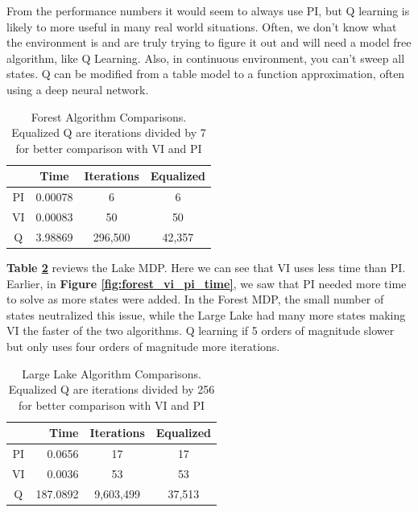 \documentclass[letterpaper]{article} %
\begin{document}
From the performance numbers it would seem to always use PI, but Q learning is likely to more useful in many real world situations.  Often, we don't know what the environment is and are truly trying to figure it out and will need a model free algorithm, like Q Learning.  Also, in continuous environment, you can't sweep all states. Q can be modified from a table model to a function approximation, often using a deep neural network.

\begin{table}[!htb]
	\begin{center}
		\begin{tabular}{| c | c  | c | c |}
			\hline
		 	& Time & Iterations & Equalized\\ 
			\hline
			\hline
			PI & \cellcolor{SpringGreen}0.00078  &  \cellcolor{SpringGreen}6  &\cellcolor{SpringGreen} 6 \\
 			VI & 0.00083 & 50 & 50 \\  
			Q & 3.98869  & 296,500  & 42,357  \\
			\hline
		\end{tabular}
	\end{center}
	\caption{Forest Algorithm Comparisons.  Equalized Q are iterations divided by 7 for better comparison with VI and PI}
	\label{table:forest_comparisons}
\end{table}

\textbf{Table \ref{table:lake_comparisons}} reviews the Lake MDP.  Here we can see that VI uses less time than PI.  Earlier, in \textbf{Figure \ref{fig:forest_vi_pi_time}}, we saw that PI needed more time to solve as more states were added.  In the Forest MDP, the small number of states neutralized this issue, while the Large Lake had many more states making VI the faster of the two algorithms.  Q learning if 5 orders of magnitude slower but only uses four orders of magnitude more iterations. 

\begin{table}[!htb]
	\begin{center}
		\begin{tabular}{| c | r  | c | c |}
			\hline
		 	& Time & Iterations & Equalized\\ 
			\hline
			\hline
			PI & 0.0656 &   \cellcolor{SpringGreen}17  &  \cellcolor{SpringGreen}17 \\
 			VI &  \cellcolor{SpringGreen}0.0036 & 53 & 53\\  
			Q & 187.0892  & 9,603,499  & 37,513  \\
			\hline
		\end{tabular}
	\end{center}
	\caption{Large Lake Algorithm Comparisons.  Equalized Q are iterations divided by 256 for better comparison with VI and PI}
	\label{table:lake_comparisons}
\end{table}
\end{document}
